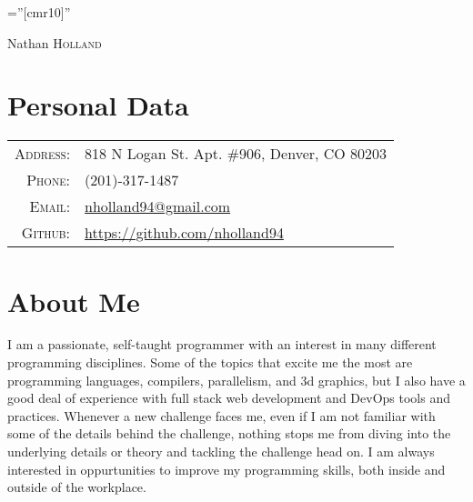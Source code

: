 \documentclass[a4paper,10pt]{article}
\begin{document}
\pagestyle{empty} %

\font\fb=''[cmr10]'' %

\par{\centering
		{\Huge Nathan \textsc{Holland}
	}\bigskip\par}

\section{Personal Data}
\begin{tabular}{rl}
  \textsc{Address:}   & 818 N Logan St. Apt. \#906, Denver, CO 80203 \\
  \textsc{Phone:}     & (201)-317-1487\\
  \textsc{Email:}     & \href{mailto:nholland94@gmail.com}{nholland94@gmail.com}\\
  \textsc{Github:}    & \href{https://github.com/nholland94}{https://github.com/nholland94}
\end{tabular}

\section{About Me}
\begin{addmargin}[3em]{1em}
I am a passionate, self-taught programmer with an interest in many different programming disciplines. Some of the topics that excite me the most are programming languages, compilers, parallelism, and 3d graphics, but I also have a good deal of experience with full stack web development and DevOps tools and practices.  Whenever a new challenge faces me, even if I am not familiar with some of the details behind the challenge, nothing stops me from diving into the underlying details or theory and tackling the challenge head on.  I am always interested in oppurtunities to improve my programming skills, both inside and outside of the workplace.
\end{addmargin}
\end{document}
